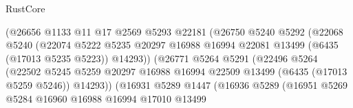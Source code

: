 \begin{lexlean}{RustCore}
\begin{coremodule}
                                      (@26656
                                        @1133
                                        @11
                                        @17
                                        @2569
                                        @5293
                                        @22181
                                        (@26750
                                          @5240
                                          @5292
                                          (@22068
                                            @5240
                                            (@22074
                                              @5222
                                              @5235
                                              @20297
                                              @16988
                                              @16994
                                              @22081
                                              @13499
                                              (@6435 (@17013 @5235 @5223))
                                              @14293))
                                          (@26771
                                            @5264
                                            @5291
                                            (@22496
                                              @5264
                                              (@22502
                                                @5245
                                                @5259
                                                @20297
                                                @16988
                                                @16994
                                                @22509
                                                @13499
                                                (@6435 (@17013 @5259 @5246))
                                                @14293))
                                            (@16931
                                              @5289
                                              @1447
                                              (@16936
                                                @5289
                                                (@16951
                                                  @5269
                                                  @5284
                                                  @16960
                                                  @16988
                                                  @16994
                                                  @17010
                                                  @13499

\end{coremodule}
\end{lexlean}
